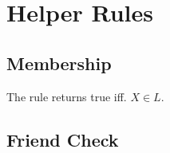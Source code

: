 %
%

\section{Helper Rules}
\label{helpers}

\subsection{Membership}
\label{appendix:member_of}
The  rule returns true iff. $X \in L$.

\subsection{Friend Check}
\label{appendix:friendCheck}
